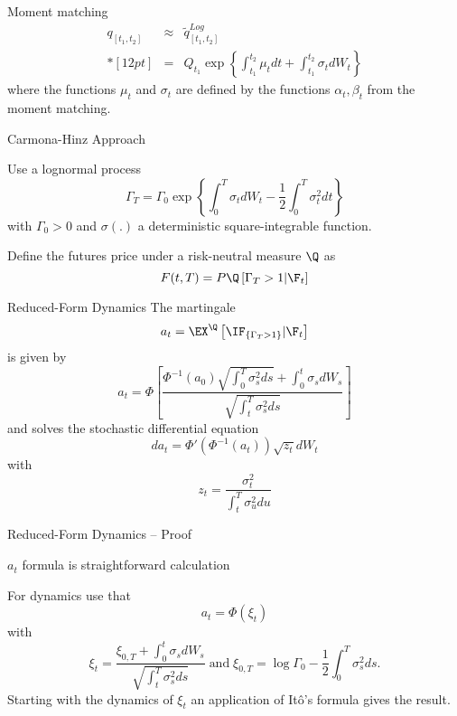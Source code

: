 	Moment matching
$$
\begin{array}{lll}
q_{[t_1,t_2]} &\approx& \tilde{q}^{Log}_{[t_1,t_2]}\\*[12pt]
&=& Q_{t_1} \exp\left\{ \int_{t_1}^{t_2}\mu_t dt + \int_{t_1}^{t_2} \sigma_t dW_t\right\}
\end{array}
$$
where the functions $\mu_t$ and $\sigma_t$ are defined by the functions $\alpha_t, \beta_t$ from the moment matching.



{Carmona-Hinz Approach}


	Use a lognormal process
$$
\Gamma_{T}= \Gamma_0  \exp{\left\{\int_{0}^{T}\sigma_t dW_t -\frac{1}{2}\int_0^T \sigma^2_t dt\right\}}
$$
with $\Gamma_0 >0$ and $\sigma(.)$ a deterministic square-integrable function.

	Define the futures price under a risk-neutral measure $\Q$ as
$$
F(t,T) = P \Q\left[\Gamma_T>1 |\F_t\right]
$$


{Reduced-Form Dynamics}
The martingale
$$
a_t = \EX^\Q\left[\IF_{\{\Gamma_T>1\}} |\F_t\right]
$$
is given by
$$
a_t= \Phi \left[\frac{\Phi^{-1}(a_0) \sqrt{\int_0^T \sigma^2_s ds}+\int_0^t \sigma_s dW_s}{\sqrt{\int_t^T \sigma^2_s ds}}\right]
$$
and solves the stochastic differential equation
$$
da_t = \Phi'\left(\Phi^{-1}(a_t)\right)\sqrt{z_t}dW_t
$$
with
$$
z_t=\frac{\sigma_t^2}{\int_t^T \sigma^2_u du}
$$

{Reduced-Form Dynamics -- Proof}


	$a_t$ formula is straightforward calculation

	For dynamics use that
$$
a_t = \Phi(\xi_t)
$$
with
$$
\xi_t = \frac{\xi_{0,T}+\int_0^t\sigma_s dW_s}{\sqrt{\int_t^T\sigma_s^2ds}}\; \mbox{and}\;  \xi_{0,T}=\log \Gamma_0 - \frac{1}{2} \int_0^T\sigma_s^2ds.
$$
Starting with the dynamics of $\xi_t$ an application of It{\^o}'s formula gives the result.



